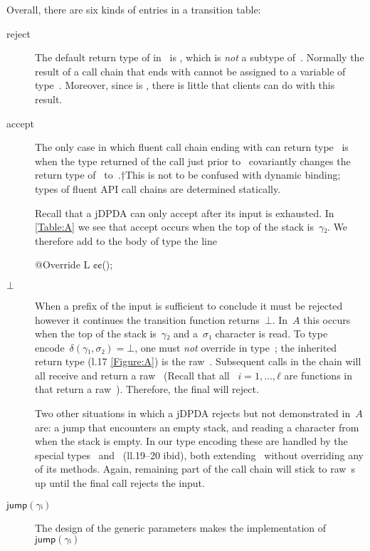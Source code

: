 Overall, there are six kinds of entries in a transition table:
\begin{description}
  \item[\textsf{reject}]
  The default return type of \cc{\$()} in~ is , which
  is \emph{not} a subtype of~. Normally the result of a call chain that ends with \cc{\$()}
  cannot be assigned to a variable of type~. Moreover, since  is ,
  there is little that clients can do with this result.
  \item[\textsf{accept}]
  The only case in which fluent call chain ending with \cc{\$()} can return
  type~ is when the type returned of the call just prior to~ covariantly
  changes the return type of~\cc{\$()} to~.†{This is not to be confused with dynamic binding;
  types of fluent API call chains are determined statically.}
  \par
  Recall that a jDPDA can only accept after its input is exhausted.
  In \cref{Table:A} we see that \textsf{accept} occurs when the top of the stack is~$γ₂$.
  We therefore add to the body of type  the line
  \begin{JAVA}
@Override L ¢\gobble$¢$();
  \end{JAVA}
  \item[$⊥$]
  When a prefix of the input is sufficient to conclude it must be rejected however it continues
  the transition function returns~$⊥$.
  In~$A$ this occurs when the top of the stack is~$γ₂$ and a~$σ₁$ character is read.
  To type encode~$δ(γ₁,σ₂) =⊥$, one must \emph{not} override  in type~;
  the inherited return type (l.17 \cref{Figure:A}) is the raw~.
  Subsequent calls in the chain will all receive and return a raw~
  (Recall that all ~$i=1,…,ℓ$ are functions in~ that return a raw~).
  Therefore, the final \cc{\$()} will reject.
  \par
  Two other situations in which a jDPDA rejects but not demonstrated in~$A$ are:
  a \textsf{jump} that encounters an empty stack, and reading a character from when the stack is empty.
  In our type encoding these are handled by the special
  types~ and~ (ll.19--20 ibid), both extending~ without
  overriding any of its methods. Again, remaining part of the call chain will stick to
  raw~s up until the final \cc{\$()} call rejects the input.
  \item[$\textsf{jump}(γᵢ)$]
  The design of the generic parameters makes the implementation of~$\textsf{jump}(γᵢ)$

\end{description}
